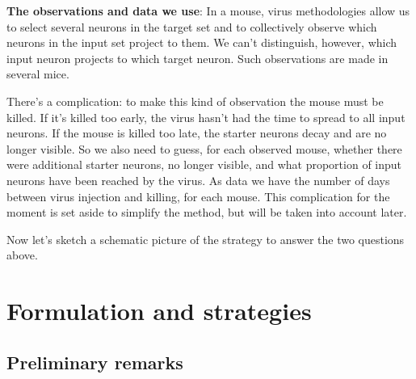 \documentclass[\ifafour a4paper,12pt,\else a5paper,10pt,\fi%
onecolumn,oneside,article,%
british%
]{memoir}
\theoremstyle{remark}
\theoremstyle{innote}
\renewcommand*{\|}[1][]{\nonscript\,#1\vert\nonscript\;\mathopen{}}
\begin{document}
\medskip

\textbf{The observations and data we use}: In a mouse, virus methodologies
allow us to select several neurons in the target set and to collectively
observe which neurons in the input set project to them. We can't
distinguish, however, which input neuron projects to which target neuron.
Such observations are made in several mice.

There's a complication: to make this kind of observation the mouse must be
killed. If it's killed too early, the virus hasn't had the time to spread
to all input neurons. If the mouse is killed too late, the starter neurons
decay and are no longer visible. So we also need to guess, for each
observed mouse, whether there were additional starter neurons, no longer
visible, and what proportion of input neurons have been reached by the
virus. As data we have the number of days between virus injection and
killing, for each mouse. This complication for the moment is set aside to
simplify the method, but will be taken into account later.

\medskip

Now let's sketch a schematic picture of the strategy to answer the two
questions above.

\section{Formulation and strategies}
\label{sec:strategies}

\setcounter{subsection}{-1}
\subsection{Preliminary remarks}
\label{sec:prelim_remarks}
\end{document}
